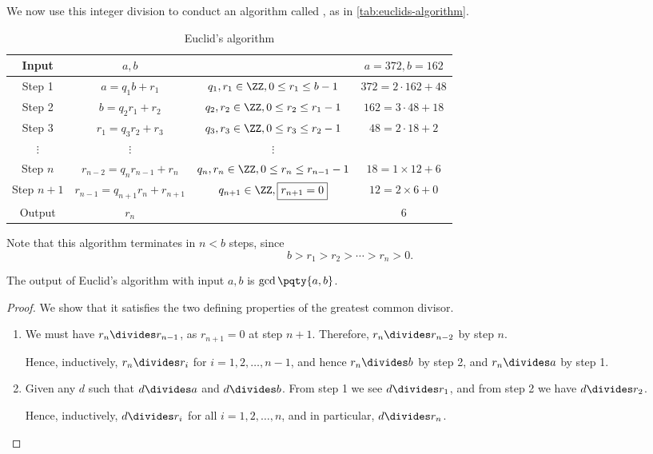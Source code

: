 We now use this integer division to conduct an algorithm called , as in \autoref{tab:euclids-algorithm}.

\begin{table}
    \centering
    \begin{tabular}{c|cc|c}
        Input & \(a, b\) && \(a = 372, b = 162\) \\
        \hline
        Step 1 & \(a = q_1 b + r_1\) & \(q_1, r_1 \in \ZZ, 0 \leq r_1 \leq b - 1\) & \(372 = 2 \cdot \boxed{162} + \boxed{48}\) \\
        Step 2 & \(b = q_2 r_1 + r_2\) & \(q_2, r_2 \in \ZZ, 0 \leq r_2 \leq r_1 - 1\) & \(162 = 3 \cdot \boxed{48} + \boxed{18}\) \\
        Step 3 & \(r_1 = q_3 r_2 + r_3\) & \(q_3, r_3 \in \ZZ, 0 \leq r_3 \leq r_2 - 1\) & \(48 = 2 \cdot \boxed{18} + \boxed{2}\) \\
        \(\vdots\) & \(\vdots\) & \(\vdots\) & \\
        Step \(n\) & \(r_{n - 2} = q_n r_{n - 1} + r_n\) & \(q_n, r_n \in \ZZ, 0 \leq r_n \leq r_{n - 1} - 1\) & \(18 = 1 \times \boxed{12} + \boxed{6}\) \\
        Step \(n + 1\) & \(r_{n - 1} = q_{n + 1} r_n + r_{n + 1}\) & \(q_{n + 1} \in \ZZ, \boxed{r_{n + 1} = 0}\) & \(12 = 2 \times \boxed{6} + \boxed{0}\) \\
        \hline
        Output & \(r_n\) & & \(6\)
    \end{tabular}
    \caption{Euclid's algorithm}
    \label{tab:euclids-algorithm}
\end{table}

Note that this algorithm terminates in \(n < b\) steps, since
\[
    b > r_1 > r_2 > \cdots > r_n > 0.
\]

\begin{theorem}
    The output of Euclid's algorithm with input \(a, b\) is \(\gcd\pqty{a, b}\).
\end{theorem}

\begin{proof}
    We show that it satisfies the two defining properties of the greatest common divisor.

    \begin{enumerate}
        \item We must have \(r_n \divides r_{n - 1}\), as \(r_{n + 1} = 0\) at step \(n + 1\). Therefore, \(r_n \divides r_{n - 2}\) by step \(n\).
        
        Hence, inductively, \(r_n \divides r_i\) for \(i = 1, 2, \ldots, n - 1\), and hence \(r_n \divides b\) by step 2, and \(r_n \divides a\) by step 1.

        \item Given any \(d\) such that \(d \divides a\) and \(d \divides b\). From step 1 we see \(d \divides r_1\), and from step 2 we have \(d \divides r_2\).
        
        Hence, inductively, \(d \divides r_i\) for all \(i = 1, 2, \ldots, n\), and in particular, \(d \divides r_n\).
    \end{enumerate}
\end{proof}

